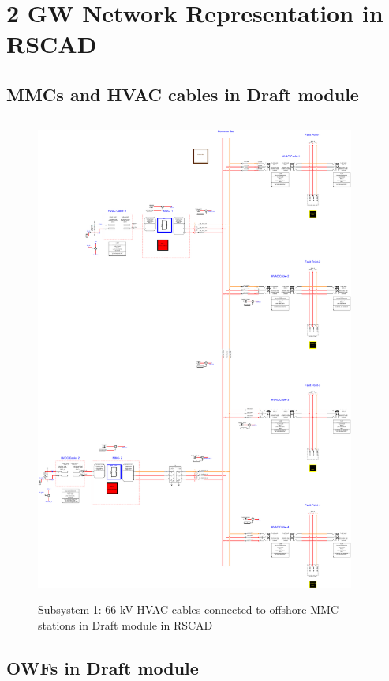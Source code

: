 \chapter{2 GW Network Representation in RSCAD}

\section{MMCs and HVAC cables in Draft module}
\begin{figure}[H]
\centering
    \includegraphics[height = 16cm,width = 10.5cm]{Diagrams/Appendix_C/MMC_2_RSCAD_Rep.pdf}
    \caption{Subsystem-1: 66 kV HVAC cables connected to offshore MMC stations in Draft module in RSCAD}
    \label{fig:MMC_2_RSCAD_Rep}
\end{figure}

\section{OWFs in Draft module}

